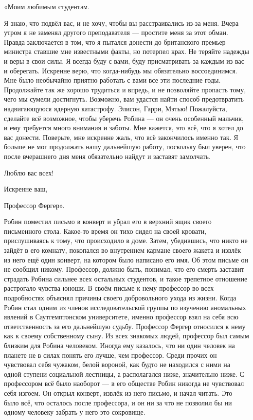 \documentclass[a4paper,12pt]{book}
\begin{document}
	«Моим любимым студентам.

	Я знаю, что подвёл вас, и не хочу, чтобы вы расстраивались из-за меня. Вчера утром я не заменял другого преподавателя — простите меня за этот обман. Правда заключается в том, что я пытался донести до британского премьер-министра ставшие мне известными факты, но потерпел крах.
	Не теряйте надежды и веры в свои силы. Я всегда буду с вами, буду присматривать за каждым из вас и оберегать. Искренне верю, что когда-нибудь мы обязательно воссоединимся.
	Мне было необычайно приятно работать с вами все эти последние годы. Продолжайте так же хорошо трудиться и впредь, и не позволяйте пропасть тому, чего мы сумели достигнуть.
	Возможно, вам удастся найти способ предотвратить надвигающуюся ядерную катастрофу.
	Элисон, Гарри, Мэтью! Пожалуйста, сделайте всё возможное, чтобы уберечь Робина — он очень особенный мальчик, и ему требуется много внимания и заботы.
	Мне кажется, это всё, что я хотел до вас донести. Поверьте, мне искренне жаль, что всё закончилось именно так. Я больше не мог продолжать нашу дальнейшую работу, поскольку был уверен, что после вчерашнего дня меня обязательно найдут и заставят замолчать.

	Люблю вас всех!

	Искренне ваш,

	Профессор Фергер».

	Робин поместил письмо в конверт и убрал его в верхний ящик своего письменного стола.
	Какое-то время он тихо сидел на своей кровати, прислушиваясь к тому, что происходило в доме. Затем, убедившись, что никто не зайдёт в его комнату, покопался во внутреннем кармане своего жакета и извлёк из него ещё один конверт, на котором было написано его имя. Об этом письме он не сообщил никому.
	Профессор, должно быть, понимал, что его смерть заставит страдать Робина сильнее всех остальных студентов, и такое трепетное отношение растрогало чувства юноши. В своём письме к нему профессор во всех подробностях объяснял причины своего добровольного ухода из жизни.	
	Когда Робин стал одним из членов исследовательской группы по изучению аномальных явлений в Саутгемптонском университете, именно профессор взял на себя всю ответственность за его дальнейшую судьбу. Профессор Фергер относился к нему как к своему собственному сыну. Из всех знакомых людей, профессор был самым близким для Робина человеком. Иногда ему казалось, что ни один человек на планете не в силах понять его лучше, чем профессор. Среди прочих он чувствовал себя чужаком, белой вороной, как будто не находился с ними на одной ступени социальной лестницы, а располагался ниже, значительно ниже. С профессором всё было наоборот — в его обществе Робин никогда не чувствовал себя изгоем.
	Он открыл конверт, извлёк из него письмо, и начал читать. Это было всё, что осталось после профессора, и он ни за что не позволил бы ни одному человеку забрать у него это сокровище.
\end{document}
